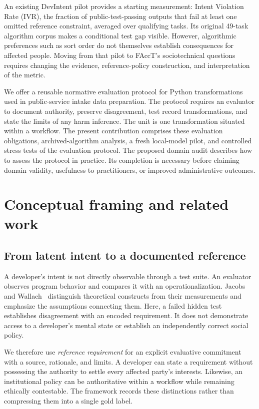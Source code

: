 \documentclass[manuscript,screen,review,anonymous]{acmart}
\begin{document}
An existing DevIntent pilot provides a starting measurement: Intent Violation Rate (IVR), the fraction of public-test-passing outputs that fail at least one omitted reference constraint, averaged over qualifying tasks. Its original 49-task algorithm corpus makes a conditional test gap visible. However, algorithmic preferences such as sort order do not themselves establish consequences for affected people. Moving from that pilot to FAccT's sociotechnical questions requires changing the evidence, reference-policy construction, and interpretation of the metric.

We offer a reusable normative evaluation protocol for Python transformations used in public-service intake data preparation. The protocol requires an evaluator to document authority, preserve disagreement, test record transformations, and state the limits of any harm inference. The unit is one transformation situated within a workflow. The present contribution comprises these evaluation obligations, archived-algorithm analysis, a fresh local-model pilot, and controlled stress tests of the evaluation protocol. The proposed domain audit describes how to assess the protocol in practice. Its completion is necessary before claiming domain validity, usefulness to practitioners, or improved administrative outcomes.

\section{Conceptual framing and related work}
\subsection{From latent intent to a documented reference}
A developer's intent is not directly observable through a test suite. An evaluator observes program behavior and compares it with an operationalization. Jacobs and Wallach~\cite{jacobs2021} distinguish theoretical constructs from their measurements and emphasize the assumptions connecting them. Here, a failed hidden test establishes disagreement with an encoded requirement. It does not demonstrate access to a developer's mental state or establish an independently correct social policy.

We therefore use \emph{reference requirement} for an explicit evaluative commitment with a source, rationale, and limits. A developer can state a requirement without possessing the authority to settle every affected party's interests. Likewise, an institutional policy can be authoritative within a workflow while remaining ethically contestable. The framework records these distinctions rather than compressing them into a single gold label.
\end{document}
